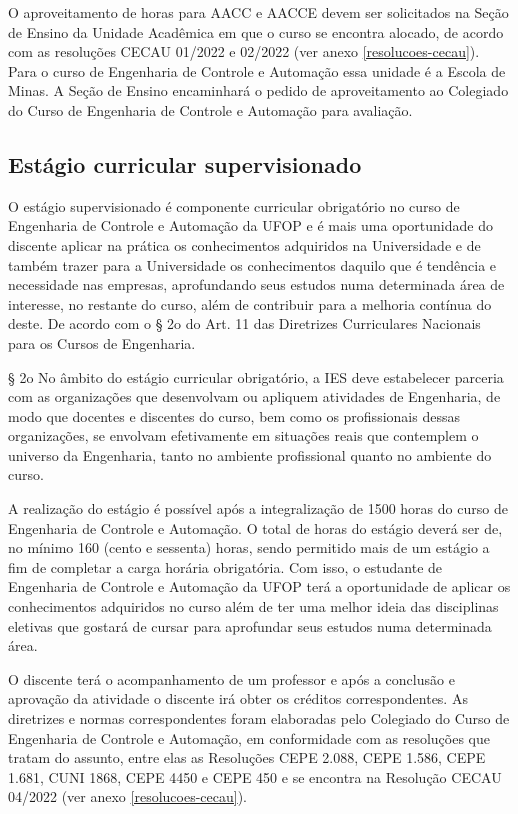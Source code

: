 \documentclass[
	12pt,				%
	openright,			%
	oneside,			%
	a4paper,			%
	english,			%
	brazil				%
	]{abntex2}
\begin{document}
O aproveitamento de horas para AACC e AACCE devem ser solicitados na Seção de Ensino da Unidade Acadêmica em que o curso se encontra alocado, de acordo com as resoluções CECAU 01/2022 e 02/2022 (ver anexo \ref{resolucoes-cecau}). Para o curso de Engenharia de Controle e Automação essa unidade é a Escola de Minas. A Seção de Ensino encaminhará o pedido de aproveitamento ao Colegiado do Curso de Engenharia de Controle e Automação para avaliação.

\subsection{Estágio curricular supervisionado}
O estágio supervisionado é componente curricular obrigatório no curso de Engenharia de Controle e Automação da UFOP e é mais uma oportunidade do discente aplicar na prática os conhecimentos adquiridos na Universidade e de também trazer para a Universidade os conhecimentos daquilo que é tendência e necessidade nas empresas, aprofundando seus estudos numa determinada área de interesse, no restante do curso, além de contribuir para a melhoria contínua do deste. De acordo com o § 2o do Art. 11 das Diretrizes Curriculares Nacionais para os Cursos de Engenharia.

        § 2o No âmbito do estágio curricular obrigatório, a IES deve estabelecer parceria com as organizações que desenvolvam ou apliquem atividades de Engenharia, de modo que docentes e discentes do curso, bem como os profissionais dessas organizações, se envolvam efetivamente
        em situações reais que contemplem o universo da Engenharia, tanto no ambiente profissional quanto no ambiente do curso.

A realização do estágio é possível após a integralização de 1500 horas do curso de Engenharia de Controle e Automação. O total de horas do estágio deverá ser de, no mínimo 160 (cento e sessenta) horas, sendo permitido mais de um estágio a fim de completar a carga horária obrigatória.  Com isso, o estudante de Engenharia de Controle e Automação da UFOP terá a oportunidade de aplicar os conhecimentos adquiridos no curso além de ter uma melhor ideia das disciplinas eletivas que gostará de cursar para aprofundar seus estudos numa determinada área.

O discente terá o acompanhamento de um professor e após a conclusão e aprovação da atividade o discente irá obter os créditos correspondentes. As diretrizes e normas correspondentes foram elaboradas pelo Colegiado do Curso de Engenharia de Controle e Automação, em conformidade com as resoluções que tratam do assunto, entre elas as Resoluções CEPE 2.088, CEPE 1.586, CEPE 1.681, CUNI 1868, CEPE 4450 e CEPE 450 e se encontra na Resolução CECAU 04/2022 (ver anexo \ref{resolucoes-cecau}).
\end{document}

